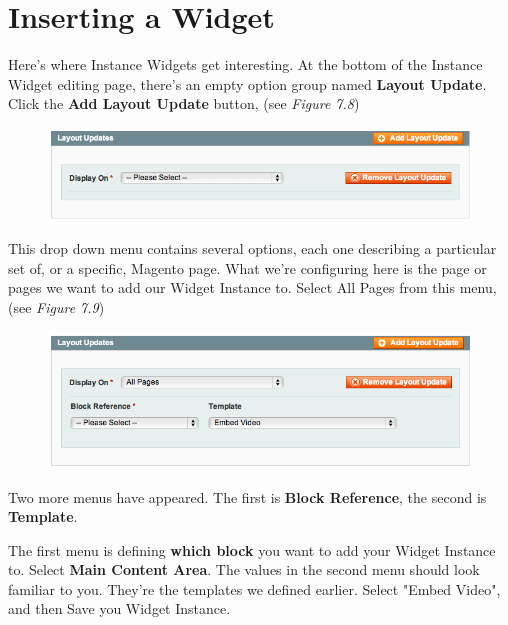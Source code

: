 \documentclass[oneside]{book}
\begin{document}
\section{Inserting a Widget}

Here's where Instance Widgets get interesting. At the bottom of the Instance Widget editing page, there's an empty option group named \textbf{Layout Update}.  Click the \textbf{Add Layout Update} button, (see \emph{Figure 7.8})

\begin{figure}[htb]
\begin{center}
\leavevmode
\includegraphics[width=1\textwidth]{images/chapter7/instance-displayon.png}
\end{center}
\caption{}
\end{figure}


This drop down menu contains several options, each one describing a particular set of, or a specific, Magento page.  What we're configuring here is the page or pages we want to add our Widget Instance to.  Select All Pages from this menu, (see \emph{Figure 7.9})

\begin{figure}[htb]
\begin{center}
\leavevmode
\includegraphics[width=1\textwidth]{images/chapter7/instance-pageselected.png}
\end{center}
\caption{}
\end{figure}


Two more menus have appeared.  The first is \textbf{Block Reference}, the second is \textbf{Template}.

The first menu is defining \textbf{which block} you want to add your Widget Instance to.  Select \textbf{Main Content Area}.  The values in the second menu should look familiar to you.  They're the templates we defined earlier.  Select "Embed Video", and then Save you Widget Instance.
\end{document}
